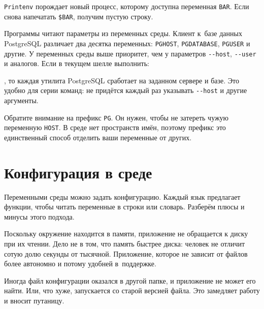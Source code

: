 \begin{english}
\end{english}

\verb|Printenv| порождает новый процесс, которому доступна переменная
\verb|BAR|. Если снова напечатать \verb|$BAR|, получим пустую строку.


Программы читают параметры из переменных среды. Клиент к~базе данных PostgreSQL
различает два десятка переменных: \verb|PGHOST|, \verb|PGDATABASE|,
\verb|PGUSER| и другие. У переменных среды выше приоритет, чем у параметров
\verb|--host|, \verb|--user| и аналогов. Если в текущем шелле выполнить:

\begin{english}
\end{english}

\noindent
, то каждая утилита PostgreSQL сработает на заданном сервере и базе. Это удобно
для серии команд: не придётся каждый раз указывать \verb|--host| и другие
аргументы.

Обратите внимание на префикс \verb|PG|. Он нужен, чтобы не затереть чужую
переменную \verb|HOST|. В среде нет пространств имён, поэтому префикс это
единственный способ отделить ваши переменные от других.

\section{Конфигурация в среде}

Переменными среды можно задать конфигурацию. Каждый язык предлагает функции,
чтобы читать переменные в строки или словарь. Разберём плюсы и минусы этого
подхода.

Поскольку окружение находится в памяти, приложение не обращается к диску при их
чтении. Дело не в том, что память быстрее диска: человек не отличит сотую долю
секунды от тысячной. Приложение, которое не зависит от файлов более автономно и
потому удобней в~поддержке.

Иногда файл конфигурации оказался в другой папке, и приложение не может его
найти. Или, что хуже, запускается со старой версией файла. Это замедляет работу
и вносит путаницу.

